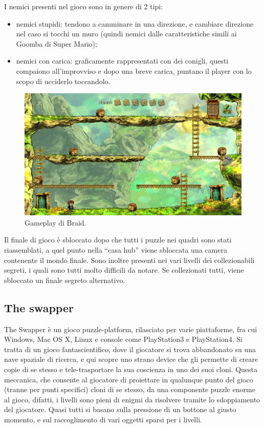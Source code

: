 I nemici presenti nel gioco sono in genere di 2 tipi:

\begin{itemize}
\item nemici stupidi: tendono a camminare in una direzione, e cambiare direzione nel caso si tocchi un muro (quindi nemici dalle caratteristiche simili ai Goomba di Super Mario);
\item nemici con carica: graficamente rappresentati con dei conigli, questi compaiono all'improvviso e dopo una breve carica, puntano il player con lo scopo di ucciderlo toccandolo.
\end{itemize}

\begin{figure}[h]
\centerline{\includegraphics[scale=0.5]{images/statoarte/bgameplay.png}}
\caption{Gameplay di Braid.}
\label{fig:bgameplay}
\end{figure}

Il finale di gioco è sbloccato dopo che tutti i puzzle nei quadri sono stati riassemblati, a quel punto nella ``casa hub'' viene sbloccata una camera contenente il mondo finale.
Sono inoltre presenti nei vari livelli dei collezionabili segreti, i quali sono tutti molto difficili da notare. Se collezionati tutti, viene sbloccato un finale segreto alternativo.



\subsection{The swapper}

The Swapper è un gioco puzzle-platform, rilasciato per varie piattaforme, fra cui Windows, Mac OS X, Linux e console come PlayStation3 e PlayStation4. Si tratta di un gioco fantascientifico, dove il giocatore si trova abbandonato su una nave spaziale di ricerca, e qui scopre uno strano device che gli permette di creare copie di se stesso e tele-trasportare la sua coscienza in uno dei suoi cloni. Questa meccanica, che consente al giocatore di proiettare in qualunque punto del gioco (tranne per punti specifici) cloni di se stesso, da una componente puzzle enorme al gioco, difatti, i livelli sono pieni di enigmi da risolvere tramite lo sdoppiamento del giocatore. Quasi tutti si basano sulla pressione di un bottone al giusto momento, e sul raccoglimento di vari oggetti sparsi per i livelli.

